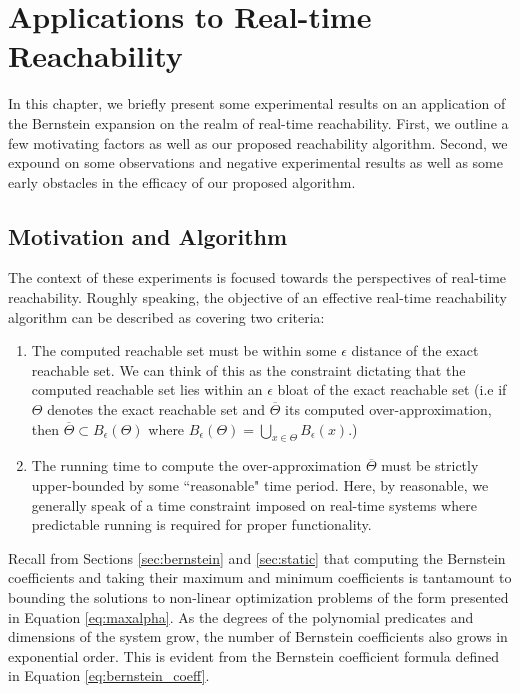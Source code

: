 \newcommand{\barb}{\overline{b}}

\newcommand{\ComputeBern}{\texttt{ComputeBernsteinCoeffIntervals}}
\newcommand{\FindOverlaps}{\texttt{FindOverlapsWithGrid}}
\newcommand{\ComputeGridRep}{\texttt{ComputeGridGeneratorRep}}



\chapter{Applications to Real-time Reachability}
%
In this chapter, we briefly present some experimental results on an application of the Bernstein expansion on the realm of real-time reachability. First, we outline a few motivating factors as well as our proposed reachability algorithm. Second, we expound on some observations and negative experimental results as well as some early obstacles in the efficacy of our proposed algorithm.
%
\section{Motivation and Algorithm}
The context of these experiments is focused towards the perspectives of real-time reachability. Roughly speaking, the objective of an effective real-time reachability algorithm can be described as covering two criteria:
%
\begin{enumerate}
  \item The computed reachable set must be within some $\epsilon$ distance of the exact reachable set. We can think of this as the constraint dictating that the computed reachable set lies within an $\epsilon$ bloat of the exact reachable set (i.e if $\Theta$ denotes the exact reachable set and $\overline{\Theta}$ its computed over-approximation, then
    $ \overline{\Theta} \subset B_\epsilon(\Theta)$
    where
    $B_\epsilon(\Theta) = \bigcup_{x \in \Theta} B_{\epsilon}(x)$.)
  \item The running time to compute the over-approximation $\overline{\Theta}$ must be strictly upper-bounded by some ``reasonable" time period. Here, by reasonable, we generally speak of a time constraint imposed on real-time systems where predictable running is required for proper functionality.
\end{enumerate}

Recall from Sections \ref{sec:bernstein} and \ref{sec:static} that computing the Bernstein coefficients and taking their maximum and minimum coefficients is tantamount to bounding the solutions to non-linear optimization problems of the form presented in Equation \ref{eq:maxalpha}. As the degrees of the polynomial predicates and dimensions of the system grow, the number of Bernstein coefficients also grows in exponential order. This is evident from the Bernstein coefficient formula defined in Equation \ref{eq:bernstein_coeff}.

